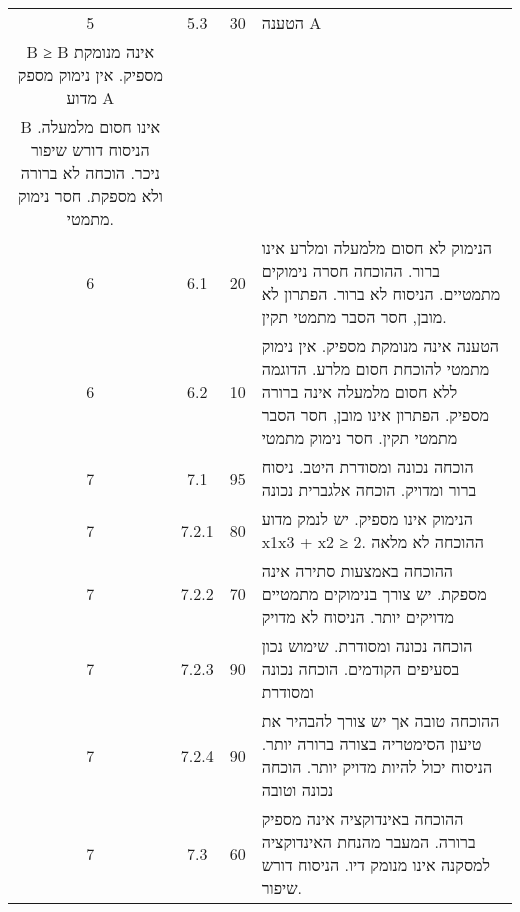 \documentclass{article}
\begin{document}
\begin{RTL}
\begin{tabular}{|c|c|c|p{10cm}|}
5 & 5.3 & 30 & הטענה A\\B ≥ B אינה מנומקת מספיק.  אין נימוק מספק מדוע A\\B אינו חסום מלמעלה.  הניסוח דורש שיפור ניכר.  הוכחה לא ברורה ולא מספקת.  חסר נימוק מתמטי. \\ \hline
6 & 6.1 & 20 & הנימוק לא חסום מלמעלה ומלרע אינו ברור.  ההוכחה חסרה נימוקים מתמטיים.  הניסוח לא ברור.  הפתרון לא מובן, חסר הסבר מתמטי תקין. \\ \hline
6 & 6.2 & 10 & הטענה אינה מנומקת מספיק.  אין נימוק מתמטי להוכחת חסום מלרע.  הדוגמה  ללא חסום מלמעלה אינה ברורה מספיק.  הפתרון אינו מובן, חסר הסבר מתמטי תקין.  חסר נימוק מתמטי \\ \hline
7 & 7.1 & 95 & הוכחה נכונה ומסודרת היטב. ניסוח ברור ומדויק.  הוכחה אלגברית נכונה \\ \hline
7 & 7.2.1 & 80 & הנימוק אינו מספיק. יש לנמק מדוע x1x3 + x2 ≥ 2.  ההוכחה לא מלאה \\ \hline
7 & 7.2.2 & 70 & ההוכחה באמצעות סתירה אינה מספקת.  יש צורך בנימוקים מתמטיים מדויקים יותר.  הניסוח לא מדויק \\ \hline
7 & 7.2.3 & 90 & הוכחה נכונה ומסודרת.  שימוש נכון בסעיפים הקודמים.  הוכחה נכונה ומסודרת \\ \hline
7 & 7.2.4 & 90 & ההוכחה טובה אך יש צורך להבהיר את טיעון הסימטריה בצורה ברורה יותר.  הניסוח יכול להיות מדויק יותר.  הוכחה נכונה וטובה \\ \hline
7 & 7.3 & 60 & ההוכחה באינדוקציה אינה מספיק ברורה.  המעבר מהנחת האינדוקציה למסקנה אינו מנומק דיו.  הניסוח דורש שיפור. \\ \hline
\end{tabular}
\end{RTL}
\end{document}
